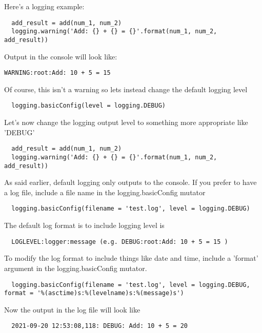 \documentclass{article}%
\begin{document}
Here's a logging example:
\begin{lstlisting}
  add_result = add(num_1, num_2)
  logging.warning('Add: {} + {} = {}'.format(num_1, num_2, add_result))
\end{lstlisting}
Output in the console will look like:
\begin{lstlisting}
WARNING:root:Add: 10 + 5 = 15
\end{lstlisting}
Of course, this isn't a warning so lets instead change the default logging level
\begin{lstlisting}
  logging.basicConfig(level = logging.DEBUG)
\end{lstlisting}
Let's now change the logging output level to something more appropriate like 'DEBUG'
\begin{lstlisting}
  add_result = add(num_1, num_2)
  logging.warning('Add: {} + {} = {}'.format(num_1, num_2, add_result))
\end{lstlisting}
As said earlier, default logging only outputs to the console. If you prefer to have a log file, include a file name in the logging.basicConfig mutator
\begin{lstlisting}
  logging.basicConfig(filename = 'test.log', level = logging.DEBUG)
\end{lstlisting}
The default log format is to include logging level is 
\begin{lstlisting}
  LOGLEVEL:logger:message (e.g. DEBUG:root:Add: 10 + 5 = 15 )
\end{lstlisting}
To modify the log format to include things like date and time, include a 'format' argument in the logging.basicConfig mutator. 
\begin{lstlisting}
  logging.basicConfig(filename = 'test.log', level = logging.DEBUG, format = '%(asctime)s:%(levelname)s:%(message)s')
\end{lstlisting}
Now the output in the log file will look like
\begin{lstlisting}
  2021-09-20 12:53:08,118: DEBUG: Add: 10 + 5 = 20
\end{lstlisting}
\end{document}

